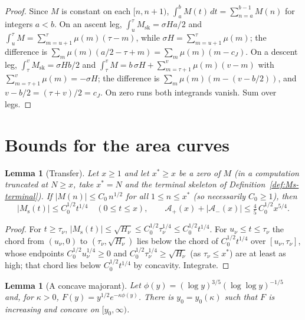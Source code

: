 \documentclass[11pt]{amsart}
\numberwithin{equation}{section}
\theoremstyle{plain}
\newtheorem{lemma}[theorem]{Lemma}
\theoremstyle{definition}
\theoremstyle{remark}
\newcommand{\Ms}{M_{\mathrm{s}}}
\newcommand{\Msk}{M_{\mathrm{sk}}}
\newcommand{\Ap}{\mathcal{A}_{+}}
\newcommand{\Am}{\mathcal{A}_{-}}
\begin{document}
\begin{proof}
Since $M$ is constant on each $[n,n+1)$, $\int_a^bM(t)\,dt=\sum_{n=a}^{b-1}M(n)$
for integers $a<b$. On an ascent leg, $\int_{u}^{\tau}\Msk=\sigma H a/2$ and
$\int_u^\tau M=\sum_{m=u+1}^{\tau}\mu(m)(\tau-m)$, while
$\sigma H=\sum_{m=u+1}^{\tau}\mu(m)$; the difference is
$\sum_m\mu(m)(a/2-\tau+m)=\sum_m\mu(m)(m-c_J)$. On a descent leg,
$\int_\tau^v\Msk=\sigma Hb/2$ and
$\int_\tau^vM=b\,\sigma H+\sum_{m=\tau+1}^{v}\mu(m)(v-m)$ with
$\sum_{m=\tau+1}^{v}\mu(m)=-\sigma H$; the difference is
$\sum_m\mu(m)(m-(v-b/2))$, and $v-b/2=(\tau+v)/2=c_J$. On zero runs
both integrands vanish. Sum over legs.
\end{proof}

\section{Bounds for the area curves}
\label{sec:bounds}

\begin{lemma}[Transfer]
\label{lem:transfer}
Let $x\ge1$ and let $x^*\ge x$ be a zero of $M$ (in a computation truncated
at $N\ge x$, take $x^*=N$ and the terminal skeleton of
Definition~\ref{def:Ms-terminal}). If $|M(n)|\le C_0\,n^{1/2}$ for all
$1\le n\le x^*$ (so necessarily $C_0\ge1$), then
\begin{equation}
\label{eq:transfer_bound}
  |\Ms(t)|\le C_0^{1/2}t^{1/4}\quad(0\le t\le x),\qquad
  \Ap(x)+|\Am(x)|\le\tfrac45\,C_0^{1/2}x^{5/4}.
\end{equation}
\end{lemma}

\begin{proof}
For $t\ge\tau_\nu$, $|\Ms(t)|\le\sqrt{H_\nu}\le C_0^{1/2}\tau_\nu^{1/4}\le
C_0^{1/2}t^{1/4}$. For $u_\nu\le t\le\tau_\nu$ the chord from $(u_\nu,0)$ to
$(\tau_\nu,\sqrt{H_\nu})$ lies below the chord of $C_0^{1/2}t^{1/4}$ over
$[u_\nu,\tau_\nu]$, whose endpoints $C_0^{1/2}u_\nu^{1/4}\ge0$ and
$C_0^{1/2}\tau_\nu^{1/4}\ge\sqrt{H_\nu}$ (as $\tau_\nu\le x^*$) are at
least as high; that chord lies below $C_0^{1/2}t^{1/4}$ by concavity.
Integrate.
\end{proof}

\begin{lemma}[A concave majorant]
\label{lem:concave-majorant}
Let $\phi(y)=(\log y)^{3/5}(\log\log y)^{-1/5}$ and, for $\kappa>0$,
$F(y)=y^{1/2}e^{-\kappa\phi(y)}$. There is $y_0=y_0(\kappa)$ such that $F$
is increasing and concave on $[y_0,\infty)$.
\end{lemma}
\end{document}
